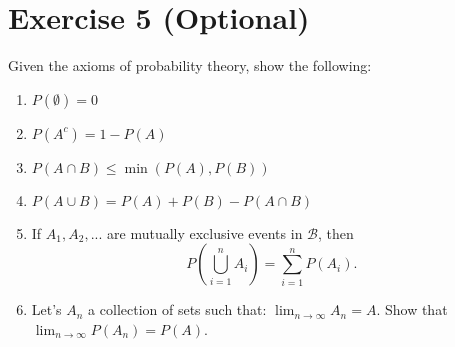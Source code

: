 \documentclass[12pt,thmsa]{article}
\begin{document}
\section*{Exercise 5 (Optional)}


Given the axioms of probability theory, show the following:
\begin{enumerate}
  \item $P(\emptyset)=0$
  \item $P(A^c)=1-P(A)$
  \item $P(A \cap B) \leq \min(P(A),P(B))$
  \item $P(A \cup B)=P(A)+P(B)-P(A \cap B)$
  \item If $A_1, A_2,...$ are mutually exclusive events in $\mathcal{B}$, then
\begin{equation}
P\left(  \bigcup_{i=1}^{n} A_i \right) = \sum_{i=1}^{n} P(A_i).  \label{Eq: ProbUnionDisj}
\end{equation}
  \item Let's $A_n$ a collection of sets such that: $\lim_{n\rightarrow \infty}A_n= A$.
  Show that $\lim_{n\rightarrow \infty}P(A_n)=P(A)$.
\end{enumerate}
\end{document}
